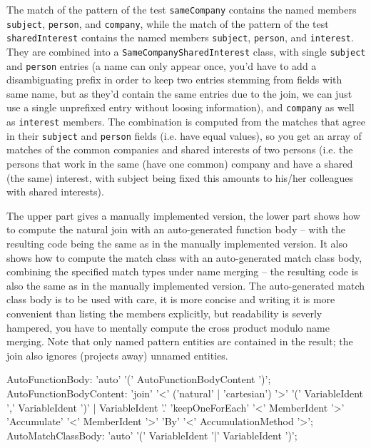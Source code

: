The match of the pattern of the test \texttt{sameCompany} contains the named members \texttt{subject}, \texttt{person}, and \texttt{company}, while the match of the pattern of the test \texttt{sharedInterest} contains the named members \texttt{subject}, \texttt{person}, and \texttt{interest}.
They are combined into a \texttt{SameCompanySharedInterest} class, with single \texttt{subject} and \texttt{person} entries (a name can only appear once, you'd have to add a disambiguating prefix in order to keep two entries stemming from fields with same name, but as they'd contain the same entries due to the join, we can just use a single unprefixed entry without loosing information), and \texttt{company} as well as \texttt{interest} members.
The combination is computed from the matches that agree in their \texttt{subject} and \texttt{person} fields (i.e. have equal values), so you get an array of matches of the common companies and shared interests of two persons (i.e. the persons that work in the same (have one common) company and have a shared (the same) interest, with subject being fixed this amounts to his/her colleagues with shared interests).

The upper part gives a manually implemented version, the lower part shows how to compute the natural join with an auto-generated function body -- with the resulting code being the same as in the manually implemented version.
It also shows how to compute the match class with an auto-generated match class body, combining the specified match types under name merging -- the resulting code is also the same as in the manually implemented version.
The auto-generated match class body is to be used with care, it is more concise and writing it is more convenient than listing the members explicitly, but readability is severly hampered, you have to mentally compute the cross product modulo name merging.
Note that only named pattern entities are contained in the result; the join also ignores (projects away) unnamed entities.

\begin{rail}
  AutoFunctionBody: 'auto' '(' AutoFunctionBodyContent ')';
  AutoFunctionBodyContent: 'join' '<' ('natural' | 'cartesian') '>' '(' VariableIdent ',' VariableIdent ')' | VariableIdent '.' 'keepOneForEach' '<' MemberIdent '>' \\ 'Accumulate' '<' MemberIdent '>' 'By' '<' AccumulationMethod '>';
  AutoMatchClassBody: 'auto' '(' VariableIdent '|' VariableIdent ')';
\end{rail}

